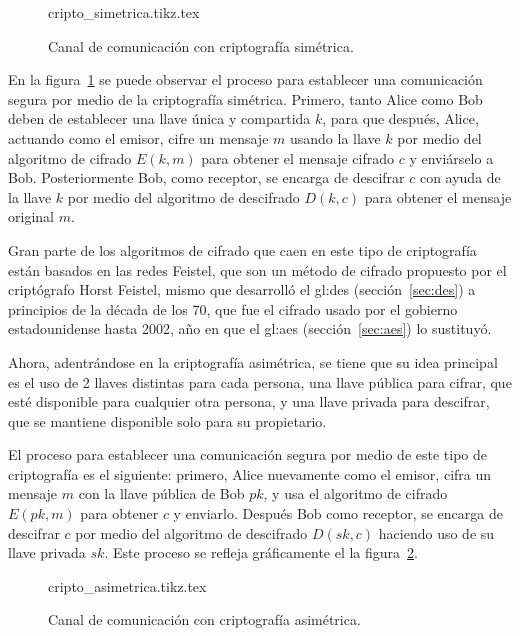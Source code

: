 \begin{figure}
  \begin{center}
    {cripto_simetrica.tikz.tex}
    \caption{Canal de comunicación con criptografía simétrica.}
    \label{cripto_simetrica}
  \end{center}
\end{figure}

En la figura~\ref{cripto_simetrica} se puede observar el proceso para
establecer una comunicación segura por medio de la criptografía simétrica.
Primero, tanto Alice como Bob deben de establecer una llave única y
compartida $k$, para que después, Alice, actuando como el emisor, cifre un
mensaje $m$ usando la llave $k$ por medio del algoritmo de cifrado $E(k,m)$
para obtener el mensaje cifrado $c$ y enviárselo a Bob. Posteriormente
Bob, como receptor, se encarga de descifrar $c$ con ayuda de la llave $k$
por medio del algoritmo de descifrado $D(k,c)$ para obtener el mensaje original
$m$.

Gran parte de los algoritmos de cifrado que caen en este tipo de criptografía
están basados en las redes Feistel, que son un método de cifrado propuesto
por el criptógrafo Horst Feistel, mismo que desarrolló el \gls{gl:des}
(sección~\ref{sec:des}) a principios de la década de los 70, que fue el
cifrado usado por el gobierno estadounidense hasta 2002, año en que el
\gls{gl:aes} (sección~\ref{sec:aes}) lo sustituyó.

Ahora, adentrándose en la criptografía asimétrica, se tiene que su idea
principal es el uso de 2 llaves distintas para cada persona, una llave
pública para cifrar, que esté disponible para cualquier otra persona, y una
llave privada para descifrar, que se mantiene disponible solo para su
propietario.

El proceso para establecer una comunicación segura por medio de este tipo
de criptografía es el siguiente: primero, Alice nuevamente como el emisor,
cifra un mensaje $m$ con la llave pública de Bob $pk$, y usa el algoritmo de
cifrado $E(pk,m)$ para obtener $c$ y enviarlo. Después Bob como receptor,
se encarga de descifrar $c$ por medio del algoritmo de descifrado
$D(sk,c)$ haciendo uso de su llave privada $sk$. Este proceso se refleja
gráficamente el la figura~\ref{cripto_asimetrica}.

\begin{figure}
  \begin{center}
    {cripto_asimetrica.tikz.tex}
    \caption{Canal de comunicación con criptografía asimétrica.}
    \label{cripto_asimetrica}
  \end{center}
\end{figure}

